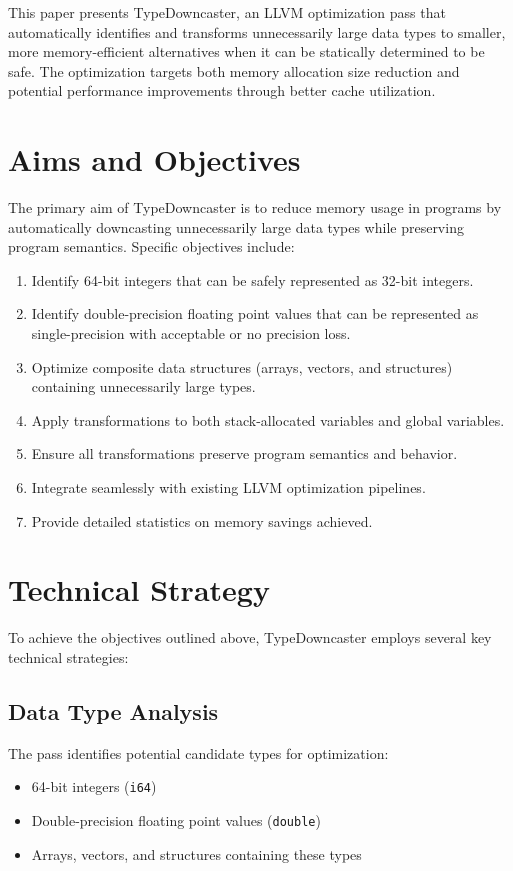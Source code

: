 \documentclass[conference]{IEEEtran}
\begin{document}
This paper presents TypeDowncaster, an LLVM \cite{llvm} optimization pass that automatically identifies and transforms unnecessarily large data types to smaller, more memory-efficient alternatives when it can be statically determined to be safe. The optimization targets both memory allocation size reduction and potential performance improvements through better cache utilization.

\section{Aims and Objectives}
The primary aim of TypeDowncaster is to reduce memory usage in programs by automatically downcasting unnecessarily large data types while preserving program semantics. Specific objectives include:

\begin{enumerate}
    \item Identify 64-bit integers that can be safely represented as 32-bit integers.
    \item Identify double-precision floating point values that can be represented as single-precision with acceptable or no precision loss.
    \item Optimize composite data structures (arrays, vectors, and structures) containing unnecessarily large types.
    \item Apply transformations to both stack-allocated variables and global variables.
    \item Ensure all transformations preserve program semantics and behavior.
    \item Integrate seamlessly with existing LLVM optimization pipelines.
    \item Provide detailed statistics on memory savings achieved.
\end{enumerate}

\section{Technical Strategy}
To achieve the objectives outlined above, TypeDowncaster employs several key technical strategies:

\subsection{Data Type Analysis}
The pass identifies potential candidate types for optimization:
\begin{itemize}
    \item 64-bit integers (\texttt{i64})
    \item Double-precision floating point values (\texttt{double})
    \item Arrays, vectors, and structures containing these types
\end{itemize}
\end{document}
